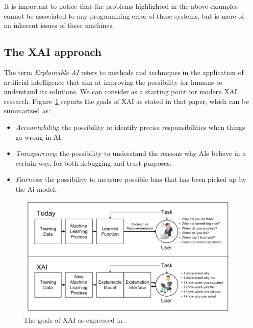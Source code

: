 \documentclass[conference]{IEEEtran}
\begin{document}
It is important to notice that the problems highlighted in the above examples
cannot be associated to any programming error of these systems, but is more of an inherent issues of these machines.


\subsection{The XAI approach}
\label{sec:xai}

The term \textit{Explainable AI} refers to methods and techniques in the application of artificial intelligence that aim at improving the possibility for humans to understand its solutions. We can consider \citet{DARPA} as a starting point for modern XAI research. Figure~\ref{fig:xai} reports the goals of XAI as stated in that paper, which can be summarized as:

\begin{itemize}
    \item \textit{Accountability}: the possibility to identify precise responsibilities when things go wrong in AI.
    \item \textit{Transparency}: the possibility to understand the reasons why AIs behave in a certain way, for both debugging and trust purposes.
    \item \textit{Fairness}: the possibility to measure possible bias that has been picked up by the Ai model.
\end{itemize}

\begin{figure}[h!] \includegraphics[width=\linewidth]{images/xai.png}
    \caption{The goals of XAI as expressed in \citet{DARPA}. } \label{fig:xai} \end{figure}
\end{document}
